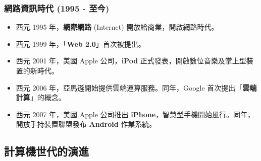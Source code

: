 \documentclass[12pt,a4paper,oneside]{book}
\begin{document}
\begin{CJK}{UTF8}{bkai}
\subsubsection{網路資訊時代 (1995 - 至今)}
\begin{itemize}
\item 西元 1995 年，\textbf{網際網路} (Internet) 開放給商業，開啟網路時代。
\item 西元 1999 年，「\textbf{Web 2.0}」首次被提出。
\item 西元 2001 年，美國 Apple 公司，\textbf{iPod} 正式發表，開啟數位音樂及掌上型裝置的新時代。
\item 西元 2006 年，亞馬遜開始提供雲端運算服務。同年，Google 首次提出「\textbf{雲端計算}」的概念。
\item 西元 2007 年，美國 Apple 公司推出 \textbf{iPhone}，智慧型手機開始風行。同年，開放手持裝置聯盟發布 \textbf{Android} 作業系統。
\end{itemize}

\subsection{計算機世代的演進}


\end{CJK}
\end{document}
